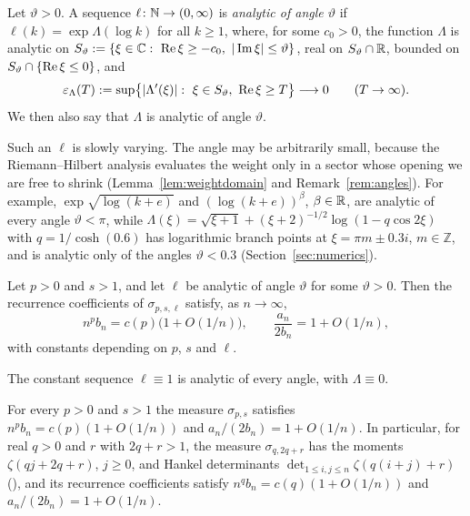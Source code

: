 \begin{definition}\label{def:analytic}
Let $\vartheta>0$. A sequence $\ell\colon\mathbb{N}\to(0,\infty)$ is \emph{analytic of angle $\vartheta$} if
$\ell(k)=\exp\Lambda(\log k)$ for all $k\ge1$, where, for some $c_0>0$, the function $\Lambda$ is analytic on
$S_\vartheta:=\{\xi\in\C:\ \re\xi\ge-c_0,\ |\im\xi|\le\vartheta\}$, real on $S_\vartheta\cap\mathbb{R}$, bounded on
$S_\vartheta\cap\{\operatorname{Re}\xi\le0\}$, and
\begin{equation}\label{eq:epsLambda}
  \varepsilon_\Lambda(T):=\sup\bigl\{|\Lambda'(\xi)|:\ \xi\in S_\vartheta,\ \operatorname{Re}\xi\ge T\bigr\}\longrightarrow0
  \qquad(T\to\infty).
\end{equation}
We then also say that $\Lambda$ is analytic of angle $\vartheta$.
\end{definition}

Such an $\ell$ is slowly varying. The angle may be arbitrarily small, because the Riemann--Hilbert analysis evaluates
the weight only in a sector whose opening we are free to shrink (Lemma~\ref{lem:weightdomain} and
Remark~\ref{rem:angles}). For example, $\exp\sqrt{\log(k+e)}$ and $(\log(k+e))^\beta$, $\beta\in\mathbb{R}$, are analytic of
every angle $\vartheta<\pi$, while $\Lambda(\xi)=\sqrt{\xi+1}+(\xi+2)^{-1/2}\log(1-q\cos2\xi)$ with $q=1/\cosh(0.6)$
has logarithmic branch points at $\xi=\pi m\pm0.3i$, $m\in\mathbb Z$, and is analytic only of the angles
$\vartheta<0.3$ (Section~\ref{sec:numerics}).

\begin{theorem}\label{thm:analytic}
Let $p>0$ and $s>1$, and let $\ell$ be analytic of angle $\vartheta$ for some $\vartheta>0$. Then the recurrence
coefficients of $\sigma_{p,s,\ell}$ satisfy, as $n\to\infty$,
\[
  n^pb_n=c(p)\bigl(1+O(1/n)\bigr),\qquad \frac{a_n}{2b_n}=1+O(1/n),
\]
with constants depending on $p$, $s$ and $\ell$.
\end{theorem}

The constant sequence $\ell\equiv1$ is analytic of every angle, with $\Lambda\equiv0$.

\begin{corollary}\label{cor:pure}
For every $p>0$ and $s>1$ the measure $\sigma_{p,s}$ satisfies $n^pb_n=c(p)(1+O(1/n))$ and $a_n/(2b_n)=1+O(1/n)$.
In particular, for real $q>0$ and $r$ with $2q+r>1$, the measure $\sigma_{q,2q+r}$ has the moments
$\zeta(qj+2q+r)$, $j\ge0$, and Hankel determinants $\det_{1\le i,j\le n}\zeta(q(i+j)+r)$
\textup{(}\cite[Corollary~1.4 and its proof]{Paper1}\textup{)}, and its recurrence coefficients satisfy
$n^qb_n=c(q)(1+O(1/n))$ and $a_n/(2b_n)=1+O(1/n)$.
\end{corollary}

